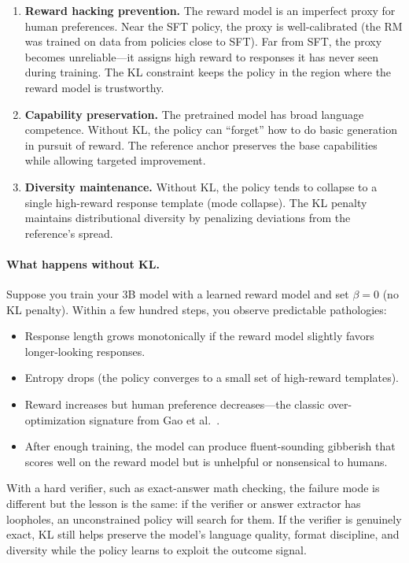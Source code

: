 \begin{enumerate}[nosep]
  \item \textbf{Reward hacking prevention.} The reward model is an imperfect proxy for human preferences. Near the SFT policy, the proxy is well-calibrated (the RM was trained on data from policies close to SFT). Far from SFT, the proxy becomes unreliable---it assigns high reward to responses it has never seen during training. The KL constraint keeps the policy in the region where the reward model is trustworthy.
  \item \textbf{Capability preservation.} The pretrained model has broad language competence. Without KL, the policy can ``forget'' how to do basic generation in pursuit of reward. The reference anchor preserves the base capabilities while allowing targeted improvement.
  \item \textbf{Diversity maintenance.} Without KL, the policy tends to collapse to a single high-reward response template (mode collapse). The KL penalty maintains distributional diversity by penalizing deviations from the reference's spread.
\end{enumerate}

\paragraph{What happens without KL.} Suppose you train your 3B model with a learned reward model and set $\beta = 0$ (no KL penalty). Within a few hundred steps, you observe predictable pathologies:

\begin{itemize}[nosep]
  \item Response length grows monotonically if the reward model slightly favors longer-looking responses.
  \item Entropy drops (the policy converges to a small set of high-reward templates).
  \item Reward increases but human preference decreases---the classic over-optimization signature from Gao et al.~\cite{gao2023scaling}.
  \item After enough training, the model can produce fluent-sounding gibberish that scores well on the reward model but is unhelpful or nonsensical to humans.
\end{itemize}

With a hard verifier, such as exact-answer math checking, the failure mode is different but the lesson is the same: if the verifier or answer extractor has loopholes, an unconstrained policy will search for them. If the verifier is genuinely exact, KL still helps preserve the model's language quality, format discipline, and diversity while the policy learns to exploit the outcome signal.

